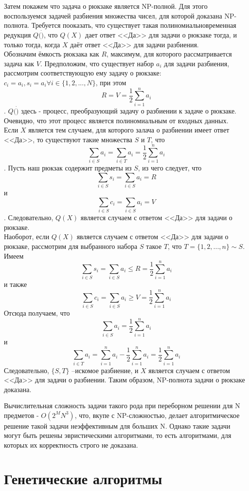 Затем покажем что задача о рюкзаке является NP-полной. Для этого воспользуемся задачей разбиения множества чисел, для которой доказана NP-полнота. 
Требуется пооказать, что существует такая полиномиальновременная редукция $Q(\dot)$, что $Q(X)$ дает ответ <<Да>> для задачи о рюкзаке тогда, и только тогда, когда $X$ даёт ответ <<Да>> для задачи разбиения.\\
Обозначим ёмкость рюкзака как $R$, максимум, для которого рассматривается задача как $V$. 
Предположим, что существует набор $a_i$ для задачи разбиения, рассмотрим соответствующую ему задачу о рюкзаке:$c_i=a_i, s_i=a_i \forall i\in\{1,2,...,N\}$, при этом \[R=V=\frac{1}{2}\sum_{i=1}^{n}a_i\]. $Q(\dot)$ здесь - процесс, преобразующий задачу о разбиении к задаче о рюкзаке. Очевидно, что этот процесс является полиномиальным от входных данных.\\
Если $X$ является тем случаем, для которого залача о разбиении имеет ответ  <<Да>>, то существуют такие множества $S$ и $T$, что
\[\sum_{i\in S}a_i=\sum_{i\in T}a_i=\frac{1}{2}\sum_{i=1}^{n}a_i\].
Пусть наш рюкзак содержит предметы из $S$, из чего следует, что \[\sum_{i\in S}s_i=\sum_{i\in S}a_i=R\] и \[\sum_{i\in S}c_i=\sum_{i\in S}a_i=V\]. Следовательно, $Q(X)$ является случаем с ответом <<Да>> для задачи о рюкзаке.\\
Наоборот, если $Q(X)$ является случаем с ответом <<Да>> для задачи о рюкзаке, рассмотрим для выбранного набора $S$ такое $T$, что $T=\{1,2,...,n\}\sim S$. 
Имеем \[\sum_{i\in S}s_i=\sum_{i\in S}a_i\leq R=\frac{1}{2}\sum_{i=1}^{n}a_i\] 
и также \[\sum_{i\in S}c_i=\sum_{i\in S}a_i\geq V=\frac{1}{2}\sum_{i=1}^{n}a_i\]
Отсюда получаем, что \[\sum_{i\in S}a_i=\frac{1}{2}\sum_{i=1}^{n}a_i\] 
и \[\sum_{i\in T}a_i=\sum_{i=1}^{n}a_i-\frac{1}{2}\sum_{i=1}^{n}a_i=\frac{1}{2}\sum_{i=1}^{n}a_i\]
Следовательно, $\{S,T\}$ --искомое разбиение, и $X$ является случаем с ответом <<Да>> для задачи о разбиении. Таким образом, NP-полнота задачи о рюкзаке доказана.



Вычислительная сложность задачи такого рода при переборном решении для N предметов - $ O(2^MN^3) $, что, вкупе с NP-сложностью, делает алгоритмическое решение такой задачи неэффективным для больших N.
Однако такие задачи могут быть решены эвристическими алгоритмами, то есть алгоритмами, для которых их корректность строго не доказана. 

\section{Генетические алгоритмы}

